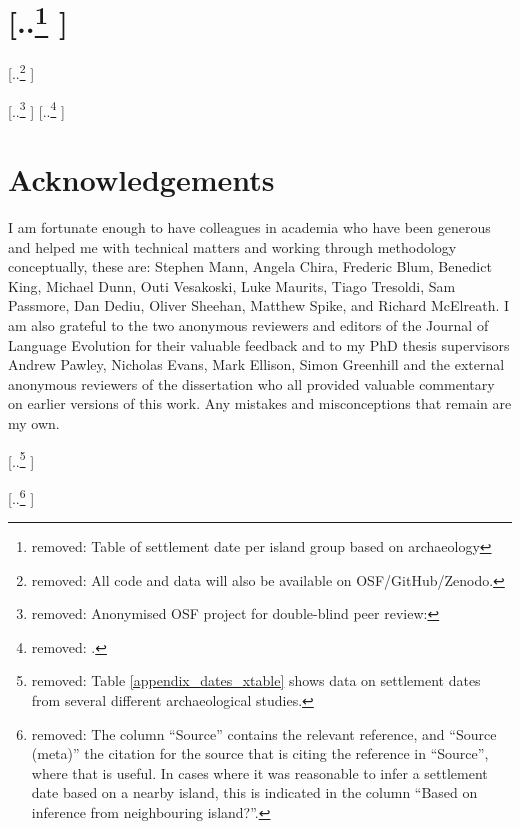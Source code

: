 \documentclass[unnumsec,webpdf,modern,medium]{oup-authoring-template}
\providecommand{\DIFaddtex}[1]{{\protect\color{blue} \sf #1}} %
\providecommand{\DIFdeltex}[1]{{\protect\color{red} [..\footnote{removed: #1} ]}} %
\providecommand{\DIFaddbegin}{} %
\providecommand{\DIFaddend}{} %
\providecommand{\DIFdelbegin}{} %
\providecommand{\DIFdelend}{} %
\providecommand{\DIFadd}[1]{\texorpdfstring{\DIFaddtex{#1}}{#1}} %
\providecommand{\DIFdel}[1]{\texorpdfstring{\DIFdeltex{#1}}{}} %
\newcommand{\DIFscaledelfig}{0.5}
\newlength{\DIFdelgraphicswidth} %
\newlength{\DIFdelgraphicsheight} %
\newcommand{\DIFaddincludegraphics}[2][]{{\color{blue}\fbox{\DIFOincludegraphics[#1]{#2}}}} %
\newcommand{\DIFdelincludegraphics}[2][]{%
\sbox{\DIFdelgraphicsbox}{\DIFOincludegraphics[#1]{#2}}%
\settoboxwidth{\DIFdelgraphicswidth}{\DIFdelgraphicsbox} %
\settoboxtotalheight{\DIFdelgraphicsheight}{\DIFdelgraphicsbox} %
\scalebox{\DIFscaledelfig}{%
\parbox[b]{\DIFdelgraphicswidth}{\usebox{\DIFdelgraphicsbox}\\[-\baselineskip] \rule{\DIFdelgraphicswidth}{0em}}\llap{\resizebox{\DIFdelgraphicswidth}{\DIFdelgraphicsheight}{%
\setlength{\unitlength}{\DIFdelgraphicswidth}%
\begin{picture}(1,1)%
\thicklines\linethickness{2pt} %
{\color[rgb]{1,0,0}\put(0,0){\framebox(1,1){}}}%
{\color[rgb]{1,0,0}\put(0,0){\line( 1,1){1}}}%
{\color[rgb]{1,0,0}\put(0,1){\line(1,-1){1}}}%
\end{picture}%
}\hspace*{3pt}}} %
} %
\DeclareRobustCommand{\DIFaddbegin}{\DIFOaddbegin \let\includegraphics\DIFaddincludegraphics} %
\DeclareRobustCommand{\DIFaddend}{\DIFOaddend \let\includegraphics\DIFOincludegraphics} %
\DeclareRobustCommand{\DIFdelbegin}{\DIFOdelbegin \let\includegraphics\DIFdelincludegraphics} %
\DeclareRobustCommand{\DIFdelend}{\DIFOaddend \let\includegraphics\DIFOincludegraphics} %
\begin{document}
\DIFdelbegin %
\DIFdelend \DIFaddbegin \newpage
\DIFaddend 

\DIFdelbegin %
\DIFdelend %

\DIFdelbegin \section{\DIFdel{Table of settlement date per island group based on archaeology}}
\addtocounter{section}{-1}%
\DIFdel{All code and data will also be available on OSF/GitHub/Zenodo.
}\DIFdelend \DIFaddbegin 

\DIFaddend 

\DIFdelbegin \DIFdel{Anonymised OSF project for double-blind peer review: }%
\DIFdel{.
}\DIFdelend \DIFaddbegin \section*{\DIFadd{Acknowledgements}}
\DIFadd{I am fortunate enough to have colleagues in academia who have been generous and helped me with technical matters and working through methodology conceptually, these are: Stephen Mann, Angela Chira, Frederic Blum, Benedict King, Michael Dunn, Outi Vesakoski, Luke Maurits, Tiago Tresoldi, Sam Passmore, Dan Dediu, Oliver Sheehan, Matthew Spike, and Richard McElreath. I am also grateful to the two anonymous reviewers and editors of the Journal of Language Evolution for their valuable feedback and to my PhD thesis supervisors Andrew Pawley, Nicholas Evans, Mark Ellison, Simon Greenhill and the external anonymous reviewers of the dissertation who all provided valuable commentary on earlier versions of this work. Any mistakes and misconceptions that remain are my own.
}\DIFaddend 



\DIFdelbegin \DIFdel{Table \ref{appendix_dates_xtable} shows data on settlement dates from several different archaeological studies. 
}%

\DIFdel{The column ``Source'' contains the relevant reference, and ``Source (meta)'' the citation for the source that is citing the reference in ``Source'', where that is useful. In cases where it was reasonable to infer a settlement date based on a nearby island, this is indicated in the column ``Based on inference from neighbouring island?''.
}%
\end{document}

